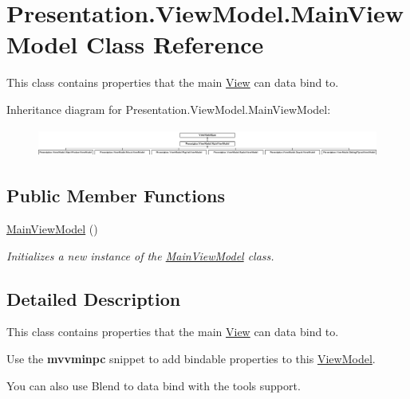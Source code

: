 \hypertarget{class_presentation_1_1_view_model_1_1_main_view_model}{}\section{Presentation.\+View\+Model.\+Main\+View\+Model Class Reference}
\label{class_presentation_1_1_view_model_1_1_main_view_model}


This class contains properties that the main \hyperlink{namespace_presentation_1_1_view}{View} can data bind to.  


Inheritance diagram for Presentation.\+View\+Model.\+Main\+View\+Model\+:\begin{figure}[H]
\begin{center}
\leavevmode
\includegraphics[height=0.942761cm]{class_presentation_1_1_view_model_1_1_main_view_model}
\end{center}
\end{figure}
\subsection*{Public Member Functions}
\begin{DoxyCompactItemize}
\item 
\hyperlink{class_presentation_1_1_view_model_1_1_main_view_model_a426844e65f93f554671ca046aec78eb3}{Main\+View\+Model} ()
\begin{DoxyCompactList}\small\item\em Initializes a new instance of the \hyperlink{class_presentation_1_1_view_model_1_1_main_view_model}{Main\+View\+Model} class. \end{DoxyCompactList}\end{DoxyCompactItemize}


\subsection{Detailed Description}
This class contains properties that the main \hyperlink{namespace_presentation_1_1_view}{View} can data bind to. 

Use the {\bfseries mvvminpc} snippet to add bindable properties to this \hyperlink{namespace_presentation_1_1_view_model}{View\+Model}. 

You can also use Blend to data bind with the tool\textquotesingle{}s support. 

